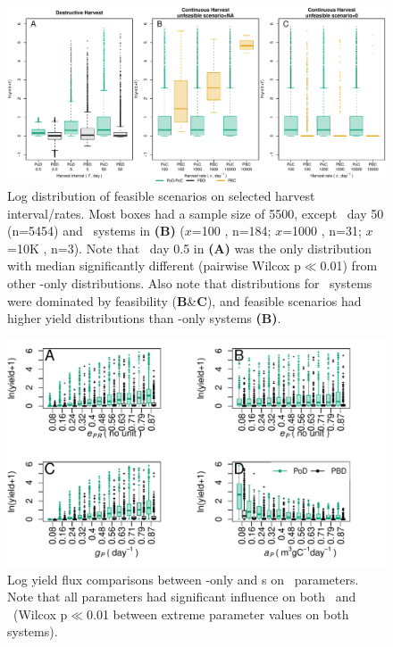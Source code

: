 \documentclass[../thesis.tex]{subfiles} %
\begin{document}
\begin{figure}[H]
    \centering
    \includegraphics[width=\linewidth]{result/Harvest.pdf}
    \caption[Yield flux distribution by harvest mode]{Log distribution of feasible scenarios on selected harvest interval/rates.  Most boxes had a sample size of 5500, except \PBN\ day 50 (n=5454) and \PBH\ systems in \textbf{(B)} ($x$=100 \dayU, n=184; $x$=1000 \dayU, n=31; $x$=10K \dayU, n=3).  Note that \PoN\ day 0.5 in \textbf{(A)} was the only distribution with median significantly different (pairwise Wilcox p$\ll$0.01) from other \phy-only distributions.  Also note that distributions for \PBH\ systems were dominated by feasibility (\textbf{B}\&\textbf{C}), and feasible scenarios had higher yield distributions than \phy-only systems \textbf{(B)}.}
    \label{f:ydByHarv}
\end{figure}

\begin{figure}[H]
    \centering
    \includegraphics[width=\linewidth]{result/bacEff1.pdf}
    \caption[Log yield flux comparisons between feasible \phy-only and \pbs s]{Log yield flux comparisons between \phy-only and \pbs s on \phy\ parameters.  Note that all parameters had significant influence on both \PoN\ and \PBN\ (Wilcox p$\ll$0.01 between extreme parameter values on both systems).}
    \label{f:bacEffect}
\end{figure}
\end{document}
